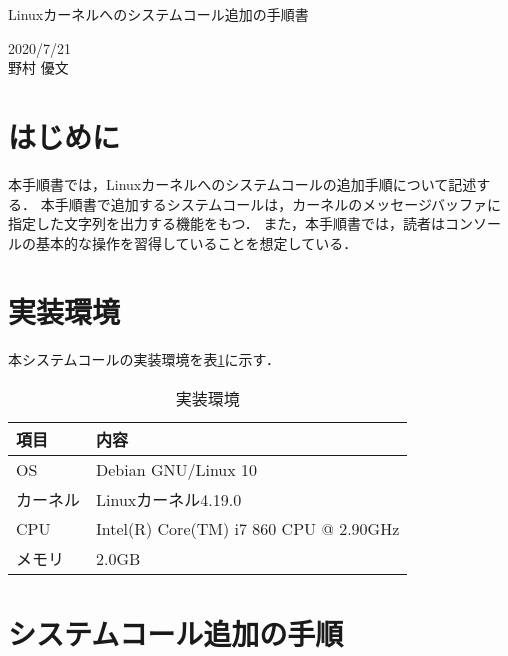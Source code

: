 \documentclass[12pt]{jsarticle}
\begin{document}
\begin{center}
  {\LARGE Linuxカーネルへのシステムコール追加の手順書}
\end{center}

\begin{flushright}
  2020/7/21\\
  野村 優文
\end{flushright}

\section{はじめに}
本手順書では，Linuxカーネルへのシステムコールの追加手順について記述する．
本手順書で追加するシステムコールは，カーネルのメッセージバッファに指定した文字列を出力する機能をもつ．
また，本手順書では，読者はコンソールの基本的な操作を習得していることを想定している．

\section{実装環境}
本システムコールの実装環境を表\ref{tab:2}に示す．

\begin{table}[h]
  \begin{center}
    \caption{実装環境}\label{tab:2}
    \begin{tabular}{l|l}
      \hline\hline
      \multicolumn{1}{l|}{項目} & \multicolumn{1}{l}{内容}\\
      \hline
      OS & Debian GNU/Linux 10\\
      カーネル & Linuxカーネル4.19.0\\
      CPU & Intel(R) Core(TM) i7 860 CPU @ 2.90GHz\\
      メモリ & 2.0GB\\
      \hline
    \end{tabular}
  \end{center}
\end{table}


\section{システムコール追加の手順}
\end{document}
